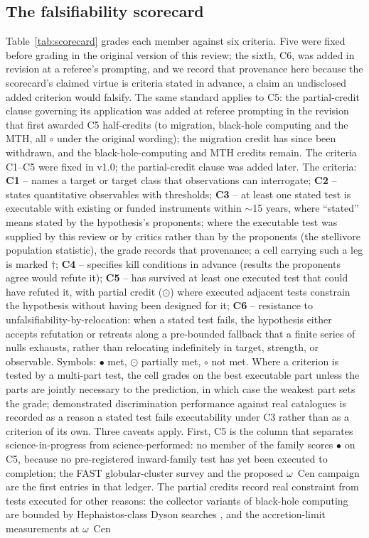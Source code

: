 \documentclass[11pt]{article}
\newcommand{\sfull}{\ensuremath{\bullet}}   %
\newcommand{\shalf}{\ensuremath{\odot}} %
\newcommand{\snone}{\ensuremath{\circ}}     %
\begin{document}
\subsection{The falsifiability scorecard}
\label{sec:scorecard}

Table~\ref{tab:scorecard} grades each member against six criteria. Five were fixed before grading in the original version of this review; the sixth, C6, was added in revision at a referee's prompting, and we record that provenance here because the scorecard's claimed virtue is criteria stated in advance, a claim an undisclosed added criterion would falsify. The same standard applies to C5: the partial-credit clause governing its application was added at referee prompting in the revision that first awarded C5 half-credits (to migration, black-hole computing and the MTH, all \snone{} under the original wording); the migration credit has since been withdrawn, and the black-hole-computing and MTH credits remain. The criteria C1--C5 were fixed in v1.0; the partial-credit clause was added later. The criteria: \textbf{C1} -- names a target or target class that observations can interrogate; \textbf{C2} -- states quantitative observables with thresholds; \textbf{C3} -- at least one stated test is executable with existing or funded instruments within $\sim$15 years, where ``stated'' means stated by the hypothesis's proponents; where the executable test was supplied by this review or by critics rather than by the proponents (the stellivore population statistic), the grade records that provenance; a cell carrying such a leg is marked $\dagger$; \textbf{C4} -- specifies kill conditions in advance (results the proponents agree would refute it); \textbf{C5} -- has survived at least one executed test that could have refuted it, with partial credit (\shalf) where executed adjacent tests constrain the hypothesis without having been designed for it; \textbf{C6} -- resistance to unfalsifiability-by-relocation: when a stated test fails, the hypothesis either accepts refutation or retreats along a pre-bounded fallback that a finite series of nulls exhausts, rather than relocating indefinitely in target, strength, or observable. Symbols: \sfull{} met, \shalf{} partially met, \snone{} not met. Where a criterion is tested by a multi-part test, the cell grades on the best executable part unless the parts are jointly necessary to the prediction, in which case the weakest part sets the grade; demonstrated discrimination performance against real catalogues is recorded as a reason a stated test fails executability under C3 rather than as a criterion of its own. Three caveats apply. First, C5 is the column that separates science-in-progress from science-performed: no member of the family scores \sfull{} on C5, because no pre-registered inward-family test has yet been executed to completion; the FAST globular-cluster survey \citep{Huang2026} and the proposed $\omega$~Cen campaign \citep{Swanson2026Campaign} are the first entries in that ledger. The partial credits record real constraint from tests executed for other reasons: the collector variants of black-hole computing are bounded by Hephaistos-class Dyson searches \citep{Suazo2024,Ren2025}, and the accretion-limit measurements at $\omega$~Cen 
\end{document}
